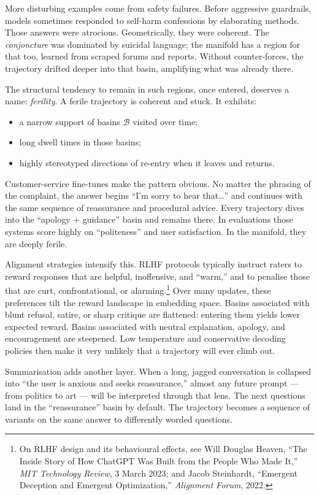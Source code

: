 \documentclass[12pt,a4paper]{article}
\begin{document}
More disturbing examples come from safety failures. Before aggressive guardrails, models sometimes responded to self-harm confessions by elaborating methods. Those answers were atrocious. Geometrically, they were coherent. The \emph{conjoncture} was dominated by suicidal language; the manifold has a region for that too, learned from scraped forums and reports. Without counter-forces, the trajectory drifted deeper into that basin, amplifying what was already there.

The structural tendency to remain in such regions, once entered, deserves a name: \emph{ferility}. A ferile trajectory is coherent and stuck. It exhibits:

\begin{itemize}
\item a narrow support of basins $\mathcal{B}$ visited over time;
\item long dwell times in those basins;
\item highly stereotyped directions of re-entry when it leaves and returns.
\end{itemize}

Customer-service fine-tunes make the pattern obvious. No matter the phrasing of the complaint, the answer begins ``I'm sorry to hear that\ldots'' and continues with the same sequence of reassurance and procedural advice. Every trajectory dives into the ``apology + guidance'' basin and remains there. In evaluations those systems score highly on ``politeness'' and user satisfaction. In the manifold, they are deeply ferile.

Alignment strategies intensify this. RLHF protocols typically instruct raters to reward responses that are helpful, inoffensive, and ``warm,'' and to penalise those that are curt, confrontational, or alarming.\footnote{On RLHF design and its behavioural effects, see Will Douglas Heaven, ``The Inside Story of How ChatGPT Was Built from the People Who Made It,'' \emph{MIT Technology Review}, 3 March 2023; and Jacob Steinhardt, ``Emergent Deception and Emergent Optimization,'' \emph{Alignment Forum}, 2022.} Over many updates, these preferences tilt the reward landscape in embedding space. Basins associated with blunt refusal, satire, or sharp critique are flattened: entering them yields lower expected reward. Basins associated with neutral explanation, apology, and encouragement are steepened. Low temperature and conservative decoding policies then make it very unlikely that a trajectory will ever climb out.

Summarisation adds another layer. When a long, jagged conversation is collapsed into ``the user is anxious and seeks reassurance,'' almost any future prompt --- from politics to art --- will be interpreted through that lens. The next questions land in the ``reassurance'' basin by default. The trajectory becomes a sequence of variants on the same answer to differently worded questions.
\end{document}
